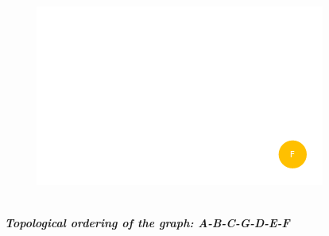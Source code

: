 \documentclass{article}
\begin{document}
\begin{figure}[H]
\centering
\includegraphics[scale=0.6]{images/Q6/07.png}
\end{figure}

\begin{center}
\textit{\\\textbf{Topological ordering of the graph: A-B-C-G-D-E-F\\}}
\end{center}
\end{document}
